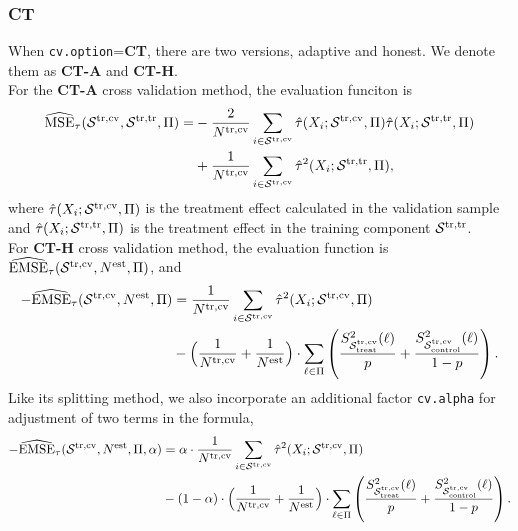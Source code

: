 \documentclass[11pt]{article}
\newcommand{\emse}{{\rm EMSE}}
\newcommand{\est}{{\rm est}}
\newcommand{\calp}{{\Pi}}
\newcommand{\cals}{{\cal S}}
\newcommand{\mse}{{\rm MSE}}
\newcommand{\control}{{\rm control}}
\newcommand{\treat}{{\rm treat}}
\newcommand{\train}{{\rm tr}}
\newcommand{\tcv}{{\rm cv}}
\begin{document}
\subsubsection{CT}
When \texttt{cv.option}=\textbf{CT}, there are two versions, adaptive and honest. We denote them as \textbf{CT-A} and \textbf{CT-H}. \\
For the \textbf{CT-A} cross validation method, the evaluation funciton is
\begin{align*}
\widehat{\mse}_\tau(\cals^{\train, \tcv},\cals^{\train, \train},\calp) =&
-\frac{2}{N^{\train, \tcv}}\sum_{i\in\cals^{\train, \tcv}}\hat\tau(X_i;\cals^{\train, \tcv},\calp)\hat\tau(X_i;\cals^{\train, \train},\calp)\\
& + \frac{1}{N^{\train, \tcv}}\sum_{i\in\cals^{\train, \tcv}}\hat\tau^2(
X_i;\cals^{\train, \train},\calp),
\end{align*}
where $\hat\tau(X_i;\cals^{\train, \tcv},\calp)$ is the treatment effect calculated in the validation sample and $\hat\tau(X_i;\cals^{\train, \train},\calp)$ is the treatment effect in the training component $\cals^{\train, \train}$.\\
For \textbf{CT-H} cross validation method, the evaluation function is $\widehat{\emse}_\tau(\cals^{\train, \tcv}, N^\est, \calp)$, and 
\begin{align*}
-\widehat{\emse}_\tau(\cals^{\train, \tcv}, N^\est, \calp) & = 
\frac{1}{N^{\train, \tcv}}\sum_{i\in\cals^{\train, \tcv}} \hat\tau^2(X_i;\cals^{\train, \tcv},\calp) \\
& -
\Bigl(\frac{1}{N^{\train, \tcv}} + \frac{1}{N^\est}\Bigr)\cdot \sum_{\ell\in\calp}
\left( \frac{S^2_{\cals^{\train, \tcv}_\treat}(\ell)}{p}+ \frac{S^2_{\cals^{\train, \tcv}_\control}(\ell)}{1-p}\right).
\end{align*}
Like its splitting method, we also incorporate an additional factor \texttt{cv.alpha} for adjustment of two terms in the formula,
\begin{align*}
-\widehat{\emse}_\tau(\cals^{\train, \tcv}, N^\est, \calp, \alpha) & = 
\alpha \cdot \frac{1}{N^{\train, \tcv}}\sum_{i\in\cals^{\train, \tcv}} \hat\tau^2(X_i;\cals^{\train, \tcv},\calp) \\
& - (1 - \alpha) \cdot
\Bigl(\frac{1}{N^{\train, \tcv}} + \frac{1}{N^\est}\Bigr)\cdot \sum_{\ell\in\calp}
\left( \frac{S^2_{\cals^{\train, \tcv}_\treat}(\ell)}{p}+ \frac{S^2_{\cals^{\train, \tcv}_\control}(\ell)}{1-p}\right).
\end{align*}
\end{document}
